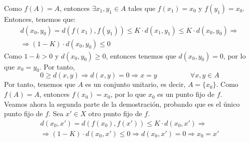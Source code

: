 \begin{ejercicio}
    Como $f(A)=A$, entonces $\exists x_1,y_1\in A$ tales que $f(x_1)=x_0$ y $f(y_1)=x_0$. Entonces, tenemos que:
    \begin{multline*}
        d(x_0,y_0) = d(f(x_1),f(y_1)) \leq K\cdot d(x_1,y_1) \leq K\cdot d(x_0,y_0)
        \Longrightarrow \\ \Longrightarrow (1-K)\cdot d(x_0,y_0) \leq 0
    \end{multline*}
    Como $1-k>0$ y $d(x_0,y_0)\geq 0$, entonces tenemos que $d(x_0,y_0)=0$, por lo que $x_0=y_0$. Por tanto,
    \begin{equation*}
        0 \geq d(x,y) \Longrightarrow d(x,y)=0 \Longrightarrow x=y \hspace{2cm} \forall x,y\in A
    \end{equation*}
    Por tanto, tenemos que $A$ es un conjunto unitario, es decir, $A=\{x_0\}$. Como $f(A)=A$, entonces $f(x_0)=x_0$,
    por lo que $x_0$ es un punto fijo de $f$.\\
    
    Veamos ahora la segunda parte de la demostración, probando que es el único punto fijo de $f$. Sea $x'\in X$ otro punto fijo de $f$.
    \begin{multline*}
        d(x_0,x') = d(f(x_0),f(x')) \leq K\cdot d(x_0,x')
        \Longrightarrow \\ \Longrightarrow
        (1-K)\cdot d(x_0,x') \leq 0 \Longrightarrow d(x_0,x') = 0 \Longrightarrow x_0=x'
    \end{multline*}
\end{ejercicio}


